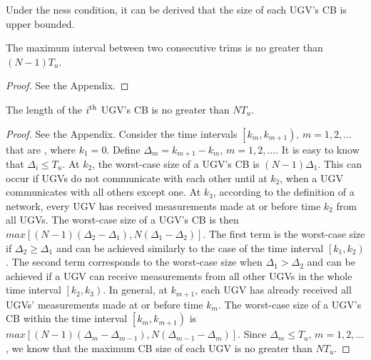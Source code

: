 	Under the \fc ness condition, it can be derived that the size of each UGV's CB is upper bounded.
	\begin{thm}
		The maximum interval between two consecutive trims is no greater than $(N-1)T_u$.
	\end{thm}
	\begin{proof}
		See the Appendix.
	\end{proof}
	
	\begin{thm}\label{thm:max_CB_size}
		The length of the $i^\text{th}$ UGV's CB is no greater than $NT_u$.
	\end{thm}
	
	\begin{proof}
		See the Appendix.
		Consider the time intervals $\left[k_m,k_{m+1} \right),\,m=1,2,\dots$ that are {\fc}, where $k_1=0$.
		Define $\Delta_m = k_{m+1}-k_m,\,m=1,2,\dots$.
		It is easy to know that $\Delta_i\le T_u$.
		At $k_2$, the worst-case size of a UGV's CB is $(N-1)\Delta_1$.	
		This can occur if UGVs do not communicate with each other until at $k_2$, when a UGV communicates with all others except one.
		At $k_3$, according to the definition of a {\fc} network, every UGV has received measurements made at or before time $k_2$ from all UGVs.
		The worst-case size of a UGV's CB is then $max \left[(N-1)(\Delta_2-\Delta_1),N(\Delta_1-\Delta_2)\right]$.  %
		The first term is the worst-case size if $\Delta_2\ge\Delta_1$ and can be achieved similarly to the case of the time interval $\left[k_1,k_2\right)$. 
		The second term corresponds to the worst-case size when $\Delta_1>\Delta_2$ and can be achieved if a UGV can receive measurements from all other UGVs in the whole time interval $\left[k_2,k_3\right)$. 
		In general, at $k_{m+1}$, each UGV has already received all UGVs' measurements made at or before time $k_m$. 
		The worst-case size of a UGV's CB within the time interval $\left[k_m,k_{m+1}\right)$ is $max\left[(N-1)(\Delta_m-\Delta_{m-1}),N(\Delta_{m-1}-\Delta_m)\right]$.
		Since $\Delta_m\le T_u,\, m=1,2,\dots$, we know that the maximum CB size of each UGV is no greater than $NT_u$.
	\end{proof}
	
